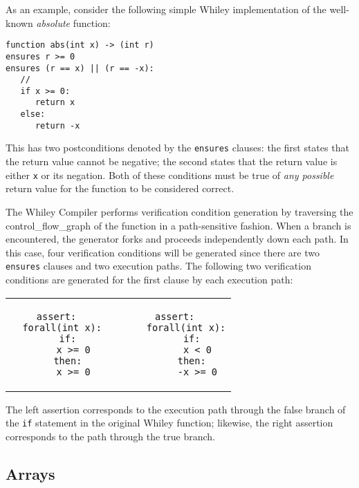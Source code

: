 As an example, consider the following simple Whiley implementation of
the well-known {\em absolute} function:

\begin{lstlisting}[language=Whiley]
function abs(int x) -> (int r)
ensures r >= 0
ensures (r == x) || (r == -x):
   //
   if x >= 0:
      return x
   else:
      return -x
\end{lstlisting}


This has two postconditions denoted by the \lstinline{ensures}
clauses: the first states that the return value cannot be negative;
the second states that the return value is either \lstinline{x} or its
negation.  Both of these conditions must be true of {\em any possible}
return value for the function to be considered correct.

The Whiley Compiler performs verification condition generation by
traversing the \gls{control_flow_graph} of the function in a
path-sensitive fashion.  When a branch is encountered, the generator
forks and proceeds independently down each path.  In this case, four
verification conditions will be generated since there are two
\lstinline{ensures} clauses and two execution paths.  The following
two verification conditions are generated for the first clause by each
execution path:

\begin{center}
\begin{tabular}{c c c}
\begin{minipage}[t]{0.45\textwidth}
\begin{lstlisting}[language=WyAL]
assert:
  forall(int x):
    if:
      x >= 0
    then:
      x >= 0
\end{lstlisting}
\end{minipage}&&
\begin{minipage}[t]{0.45\textwidth}
\begin{lstlisting}[language=WyAL]
  assert:
    forall(int x):
      if:
        x < 0
      then:
        -x >= 0
\end{lstlisting}
\end{minipage}\\
\end{tabular}
\end{center}
The left assertion corresponds to the execution path through the false
branch of the \lstinline{if} statement in the original Whiley
function; likewise, the right assertion corresponds to the path
through the true branch.  

\subsection{Arrays}
